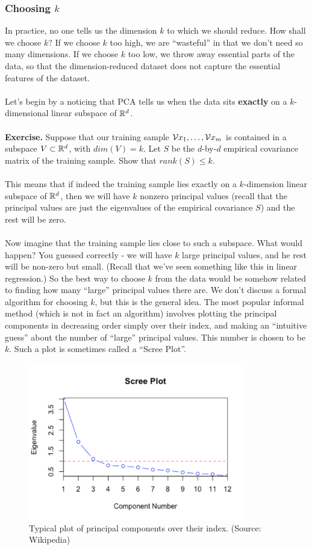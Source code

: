 \subsubsection{Choosing $k$}

In practice, no one tells us the dimension $k$ to which we should reduce. 
How shall we choose $k$? If we choose $k$ too high, we are ``wasteful'' in that
we don't need so many dimensions. If we choose $k$ too low, we throw away
essential parts of the data, so that the dimension-reduced dataset does not
capture the essential features of the dataset.
\\~\\
Let's begin by a noticing that PCA tells us when the data sits 
{\bf exactly} on a
$k$-dimensional linear subspace of $\mathbb{R}^d$. 
\\~\\
{\bf Exercise.} 
Suppose that our training sample $\mathcal{V}{x}_1,\ldots,\mathcal{V}{x}_m$ is contained in a
subspace $V\subset \mathbb{R}^d$, with $dim(V)=k$. Let $S$ be the $d$-by-$d$
 empirical covariance
 matrix of the training sample. Show that $rank(S)\leq k$.
\\~\\ 
 This means that if indeed the training sample lies exactly on a $k$-dimension
 linear subspace of $\mathbb{R}^d$, then we will have $k$ nonzero principal values
 (recall that the principal values are just the eigenvalues of the empirical
 covariance $S$) and the rest will be zero. 
\\~\\
Now imagine that the training sample lies close to such a subspace. What would
happen? You guessed correctly - we will have $k$ large principal values, and he
rest will be non-zero but small. (Recall that we've seen something like this in
linear regression.) So the best way to choose $k$ from the data would be somehow
related to finding how many ``large'' principal values there are. We don't
discuss a formal algorithm for choosing $k$, but this is the general idea.
The most popular informal method (which is not in fact an algorithm) involves
plotting the principal components in decreasing order simply over their index,
and making an ``intuitive guess'' about the number of ``large'' principal
values. This number is chosen to be $k$. Such a plot is sometimes called a
``Scree Plot''. 
\begin{figure}[H]
      \centering
      \includegraphics[height=2.7in]{screeplot.pdf}        
      \caption{Typical plot of principal components over their index. (Source:
      Wikipedia)}
    \end{figure}
